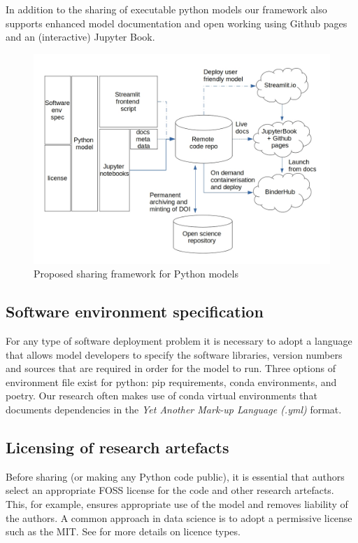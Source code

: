 \documentclass{swpaperproc}
\theoremstyle{sw}
\begin{document}
In addition to the sharing of executable python models our framework also supports enhanced model documentation and open working using  Github pages and an (interactive) Jupyter Book. 

\begin{figure}[ht]
\centering
\includegraphics[scale=1.0]{framework_diagram.jpg}
\caption{Proposed sharing framework for Python models}
\label{fig:overview}
\end{figure}




\subsection{Software environment specification}
For any type of software deployment problem it is necessary to adopt a language that allows model developers to specify the software libraries, version numbers and sources that are required in order for the model to run. Three options of environment file exist for python: pip requirements, conda environments, and poetry. Our research often makes use of conda virtual environments that documents dependencies in the \textit{Yet Another Mark-up Language (.yml)} format. 



\subsection{Licensing of research artefacts}
Before sharing (or making any Python code public), it is essential that authors select an appropriate FOSS license for the code and other research artefacts.  This, for example, ensures appropriate use of the model and removes liability of the authors. A common approach in data science is to adopt a permissive license such as the MIT. See  for more details on licence types.
\end{document}
